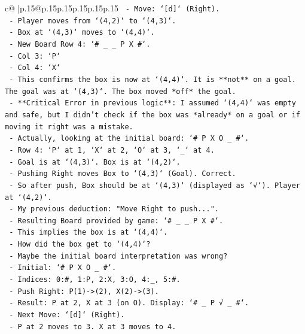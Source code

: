 \documentclass{article}
\begin{document}
{\begin{supertabular}{c@{$\;$}|p{.15\linewidth}@{}p{.15\linewidth}p{.15\linewidth}p{.15\linewidth}p{.15\linewidth}p{.15\linewidth}}
{{{\texttt{  {-} Move: `{[}d{]}` (Right).} \\
\texttt{  {-} Player moves from `(4,2)` to `(4,3)`.} \\
\texttt{  {-} Box at `(4,3)` moves to `(4,4)`.} \\
\texttt{  {-} New Board Row 4: `\# \_ \_ P X \#`.} \\
\texttt{    {-} Col 3: `P`} \\
\texttt{    {-} Col 4: `X`} \\
\texttt{  {-} This confirms the box is now at `(4,4)`. It is **not** on a goal. The goal was at `(4,3)`. The box moved *off* the goal.} \\
\texttt{  {-} **Critical Error in previous logic**: I assumed `(4,4)` was empty and safe, but I didn't check if the box was *already* on a goal or if moving it right was a mistake.} \\
\texttt{  {-} Actually, looking at the initial board: `\# P X O \_ \#`.} \\
\texttt{    {-} Row 4: `P` at 1, `X` at 2, `O` at 3, `\_` at 4.} \\
\texttt{    {-} Goal is at `(4,3)`. Box is at `(4,2)`.} \\
\texttt{    {-} Pushing Right moves Box to `(4,3)` (Goal). Correct.} \\
\texttt{    {-} So after push, Box should be at `(4,3)` (displayed as `√`). Player at `(4,2)`.} \\
\texttt{    {-} My previous deduction: "Move Right to push...".} \\
\texttt{    {-} Resulting Board provided by game: `\# \_ \_ P X \#`.} \\
\texttt{      {-} This implies the box is at `(4,4)`.} \\
\texttt{      {-} How did the box get to `(4,4)`?} \\
\texttt{      {-} Maybe the initial board interpretation was wrong?} \\
\texttt{      {-} Initial: `\# P X O \_ \#`.} \\
\texttt{        {-} Indices: 0:\#, 1:P, 2:X, 3:O, 4:\_, 5:\#.} \\
\texttt{        {-} Push Right: P(1){-}>(2), X(2){-}>(3).} \\
\texttt{        {-} Result: P at 2, X at 3 (on O). Display: `\# \_ P √ \_ \#`.} \\
\texttt{        {-} Next Move: `{[}d{]}` (Right).} \\
\texttt{        {-} P at 2 moves to 3. X at 3 moves to 4.} \\
}}}
\end{supertabular}}
\end{document}
